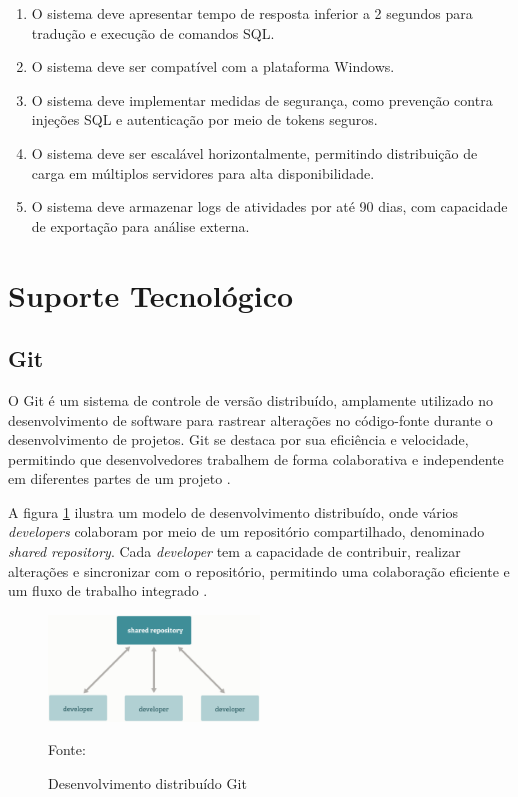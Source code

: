 \begin{enumerate}[label=\textbf{RNF\arabic*:}, leftmargin=*, align=left]
    \item O sistema deve apresentar tempo de resposta inferior a 2 segundos para tradução e execução de comandos SQL.
    \item O sistema deve ser compatível com a plataforma Windows.
    \item O sistema deve implementar medidas de segurança, como prevenção contra injeções SQL e autenticação por meio de tokens seguros.
    \item O sistema deve ser escalável horizontalmente, permitindo distribuição de carga em múltiplos servidores para alta disponibilidade.
    \item O sistema deve armazenar logs de atividades por até 90 dias, com capacidade de exportação para análise externa.
\end{enumerate}


\section{Suporte Tecnológico}

\subsection{Git}

O Git é um sistema de controle de versão distribuído, amplamente utilizado no desenvolvimento de software para rastrear alterações no código-fonte durante o desenvolvimento de projetos. Git se destaca por sua eficiência e velocidade, permitindo que desenvolvedores trabalhem de forma colaborativa e independente em diferentes partes de um projeto \cite{git2025}.

A figura \ref{fig:git2025} ilustra um modelo de desenvolvimento distribuído, onde vários \textit{developers} colaboram por meio de um repositório compartilhado, denominado \textit{shared repository}. Cada \textit{developer} tem a capacidade de contribuir, realizar alterações e sincronizar com o repositório, permitindo uma colaboração eficiente e um fluxo de trabalho integrado \cite{git2025}.

\begin{figure}[H]
    \centering
    \includegraphics[width=0.5\textwidth]{figuras/git_distribiuted_work.eps}
    \caption{Desenvolvimento distribuído Git}
    Fonte: \cite{git2025}
    \label{fig:git2025}
\end{figure}

